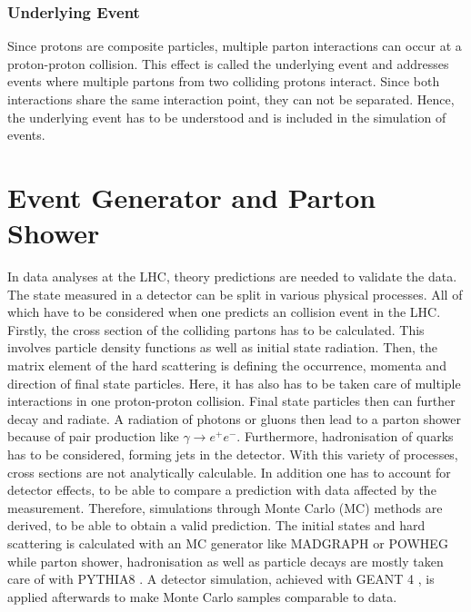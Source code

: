 \subsubsection{Underlying Event}
	Since protons are composite particles, multiple parton interactions can occur at a proton-proton collision. This effect is called the underlying event and addresses events where multiple partons from two colliding protons interact. Since both interactions share the same interaction point, they can not be separated. Hence, the underlying event has to be understood and is included in the simulation of events.
	
\section{Event Generator and Parton Shower}
\label{sec:Simulation}
	In data analyses at the LHC, theory predictions are needed to validate the data. The state measured in a detector can be split in various physical processes. All of which have to be considered when one predicts an collision event in the LHC. Firstly, the cross section of the colliding partons has to be calculated. This involves particle density functions as well as initial state radiation. Then, the matrix element of the hard scattering is defining the occurrence, momenta and direction of final state particles. Here, it has also has to be taken care of multiple interactions in one proton-proton collision. Final state particles then can further decay and radiate. A radiation of photons or gluons then lead to a parton shower because of pair production like $\gamma \rightarrow e^+ e^-$. Furthermore, hadronisation of quarks has to be considered, forming jets in the detector. With this variety of processes, cross sections are not analytically calculable. In addition one has to account for detector effects, to be able to compare a prediction with data affected by the measurement. Therefore, simulations through Monte Carlo (MC) methods are derived, to be able to obtain a valid prediction. The initial states and hard scattering is calculated with an MC generator like MADGRAPH \cite{madgraph} or POWHEG \cite{powheg} while parton shower, hadronisation as well as particle decays are mostly taken care of with PYTHIA8 \cite{pythia8}. A detector simulation, achieved with GEANT 4 \cite{geant4}, is applied afterwards to make Monte Carlo samples comparable to data.
